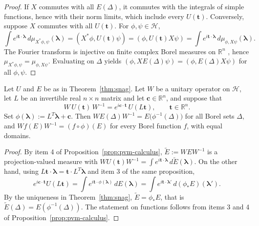 \begin{proof}
	If $X$ commutes with all $E(\Delta)$, it commutes with the integrals of simple functions, hence with their norm limits, which include every $U(\mathbf{t})$. Conversely, suppose $X$ commutes with all $U(\mathbf{t})$. For $\phi,\psi\in\mathcal{H}$,
	\begin{equation*}
		\int e^{i\mathbf{t}\cdot\boldsymbol{\lambda}}\,d\mu_{X^*\phi,\psi}(\boldsymbol{\lambda})=(X^*\phi,U(\mathbf{t})\psi)=(\phi,U(\mathbf{t})X\psi)=\int e^{i\mathbf{t}\cdot\boldsymbol{\lambda}}\,d\mu_{\phi,X\psi}(\boldsymbol{\lambda}).
	\end{equation*}
	The Fourier transform is injective on finite complex Borel measures on $\mathbb{R}^n$ \cite[TODO-location]{TODO-FourierUniqueness}, hence $\mu_{X^*\phi,\psi}=\mu_{\phi,X\psi}$. Evaluating on $\Delta$ yields $(\phi,XE(\Delta)\psi)=(\phi,E(\Delta)X\psi)$ for all $\phi,\psi$.
\end{proof}

\begin{proposition}\label{prop:pvm-covariance}
	Let $U$ and $E$ be as in Theorem~\ref{thm:snag}. Let $W$ be a unitary operator on $\mathcal{H}$, let $L$ be an invertible real $n\times n$ matrix and let $\mathbf{c}\in\mathbb{R}^n$, and suppose that
	\begin{equation*}
		W\,U(\mathbf{t})\,W^{-1}=e^{i\mathbf{c}\cdot\mathbf{t}}\,U(L\mathbf{t}), \qquad \mathbf{t}\in\mathbb{R}^n.
	\end{equation*}
	Set $\phi(\boldsymbol{\lambda}):=L^{T}\boldsymbol{\lambda}+\mathbf{c}$. Then $WE(\Delta)W^{-1}=E\big(\phi^{-1}(\Delta)\big)$ for all Borel sets $\Delta$, and $Wf(E)W^{-1}=(f\circ\phi)(E)$ for every Borel function $f$, with equal domains.
\end{proposition}

\begin{proof}
	By item 4 of Proposition~\ref{prop:pvm-calculus}, $\widetilde{E}:=WEW^{-1}$ is a projection-valued measure with $WU(\mathbf{t})W^{-1}=\int e^{i\mathbf{t}\cdot\boldsymbol{\lambda}}\,d\widetilde{E}(\boldsymbol{\lambda})$. On the other hand, using $L\mathbf{t}\cdot\boldsymbol{\lambda}=\mathbf{t}\cdot L^T\boldsymbol{\lambda}$ and item 3 of the same proposition,
	\begin{equation*}
		e^{i\mathbf{c}\cdot\mathbf{t}}U(L\mathbf{t})=\int e^{i\mathbf{t}\cdot\phi(\boldsymbol{\lambda})}\,dE(\boldsymbol{\lambda})=\int e^{i\mathbf{t}\cdot\boldsymbol{\lambda}'}\,d(\phi_*E)(\boldsymbol{\lambda}').
	\end{equation*}
	By the uniqueness in Theorem~\ref{thm:snag}, $\widetilde{E}=\phi_*E$, that is $\widetilde{E}(\Delta)=E(\phi^{-1}(\Delta))$. The statement on functions follows from items 3 and 4 of Proposition~\ref{prop:pvm-calculus}.
\end{proof}

